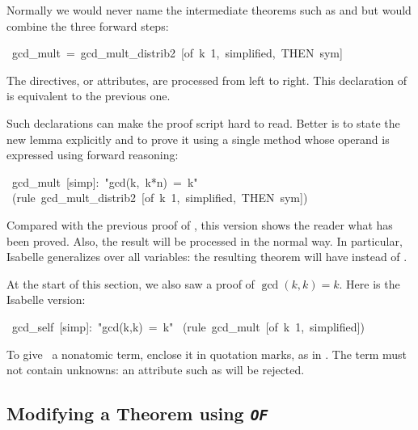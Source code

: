 %
Normally we would never name the intermediate theorems
such as  and  but would combine
the three forward steps: 
\begin{isabelle}
\ gcd_mult\ =\ gcd_mult_distrib2\ [of\ k\ 1,\ simplified,\ THEN\ sym]%
\end{isabelle}
The directives, or attributes, are processed from left to right.  This
declaration of  is equivalent to the
previous one.

Such declarations can make the proof script hard to read.  Better   
is to state the new lemma explicitly and to prove it using a single
 method whose operand is expressed using forward reasoning:
\begin{isabelle}
\ gcd_mult\
[simp]:\
"gcd(k,\ k*n)\ =\ k"\isanewline
{}\ (rule\ gcd_mult_distrib2\ [of\ k\ 1,\ simplified,\ THEN\ sym])
\end{isabelle}
Compared with the previous proof of \isa{gcd_mult}, this
version shows the reader what has been proved.  Also, the result will be processed
in the normal way.  In particular, Isabelle generalizes over all variables: the
resulting theorem will have {\isa{?k}} instead of {\isa{k}}.

At the start  of this section, we also saw a proof of $\gcd(k,k)=k$.  Here
is the Isabelle version:
\begin{isabelle}
\isacommand{lemma}\ gcd_self\ [simp]:\ "gcd(k,k)\ =\ k"\isanewline
\isacommand{by}\ (rule\ gcd_mult\ [of\ k\ 1,\ simplified])
\end{isabelle}

\begin{warn}
To give~ a nonatomic term, enclose it in quotation marks, as in
\isa{[of "k*m"]}.  The term must not contain unknowns: an
attribute such as 
\isa{[of "?k*m"]} will be rejected.
\end{warn}


\subsection{Modifying a Theorem using {\tt\slshape OF}}


